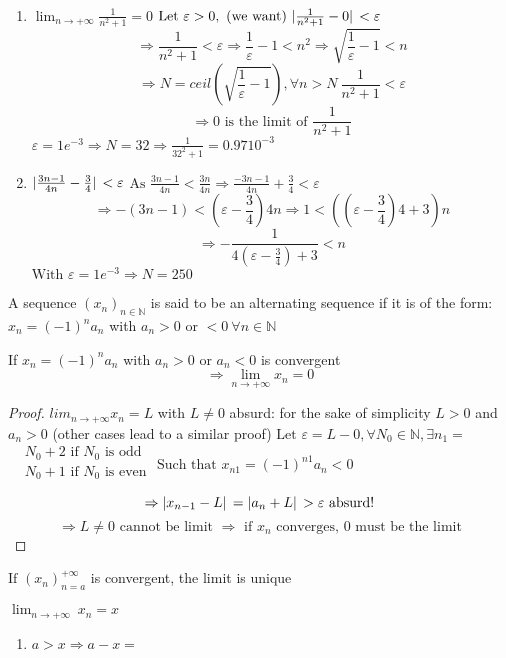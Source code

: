 \documentclass[12pt, a4paper]{book}
\begin{document}
\begin{exmp} \
  \begin{enumerate}[label=\alph*]
    \item $\lim_{n \rightarrow +\infty} \frac{1}{n^2+1}=0$ \newline
    $\text{Let } \varepsilon >0, \text{ (we want) }\abs*{\frac{1}{n^2+1}-0}< \varepsilon$
    $$\Rightarrow \frac{1}{n^2+1}< \varepsilon \Rightarrow \frac{1}{\varepsilon}-1 < n^2 \Rightarrow \sqrt{\frac{1}{\varepsilon}-1}<n$$
    $$\Rightarrow N=ceil(\sqrt{\frac{1}{\varepsilon}-1}), \forall n >N \ \frac{1}{n^2+1}< \varepsilon$$
    $$\Rightarrow 0 \text{ is the limit of } \frac{1}{n^2+1}$$
    $\varepsilon = 1e^{-3} \Rightarrow N=32 \Rightarrow \frac{1}{32^2+1}=0.9710^{-3}$

    \item  $\abs*{\frac{3n-1}{4n}-\frac{3}{4}} < \varepsilon$ \newline
    $\text{As } \frac{3n-1}{4n} < \frac{3n}{4n} \Rightarrow \frac{-3n-1}{4n} + \frac{3}{4} < \varepsilon$
    $$\Rightarrow -(3n-1) < (\varepsilon -\frac{3}{4})4n \Rightarrow 1< ((\varepsilon -\frac{3}{4})4+3)n$$
    $$\Rightarrow -\frac{1}{4(\varepsilon -\frac{3}{4})+3} < n$$
    $\text{With } \varepsilon=1e^{-3} \Rightarrow N=250$
  \end{enumerate}
\end{exmp}

\begin{defn} A sequence $(x_n)_{n\in \mathbb{N}}$ is said to be an alternating sequence if it is of the form: $x_n=(-1)^n a_n$ with $a_n>0$ or $<0 \ \forall n \in \mathbb{N}$
\end{defn}

\begin{exmp} If $x_n=(-1)^n a_n$ with $a_n>0$ or $a_n<0$ is convergent 
  $$\Rightarrow \lim_{n \rightarrow +\infty} x_n=0$$
\end{exmp}

\begin{proof}
  $lim_{n \rightarrow +\infty} x_n =L$ with $L \neq 0$ absurd: for the sake of simplicity $L>0$ and $a_n>0$ (other cases lead to a similar proof) \newline
  $\text{Let } \varepsilon=L-0, \forall N_0 \in \mathbb{N}, \exists n_1=$
  $\begin{alignedat}{2}
    &N_0+2 \text{ if $N_0$ is odd}\\
    &N_0+1 \text{ if $N_0$ is even}\\
  \end{alignedat}$ \newline
  $\text{Such that } x_{n1}=(-1)^{n1}a_n<0$
  $$\Rightarrow \abs*{x_{n-1}-L}= \abs*{a_n+L}> \varepsilon \text{ absurd!}$$
  $$\Rightarrow L\neq 0 \text{ cannot be limit } \Rightarrow \text{ if } x_n \text{ converges, $0$ must be the limit}$$
\end{proof}

\begin{prop}
  $\text{If } (x_n)^{+\infty}_{n=a}$ is convergent, the limit is unique
\end{prop}

\begin{exmp} $\lim_{n \rightarrow +\infty} \ x_n=x$
  \begin{enumerate}[label=\alph*]
    \item $a>x \Rightarrow a-x=$
  \end{enumerate}
  
\end{exmp}
\end{document}

